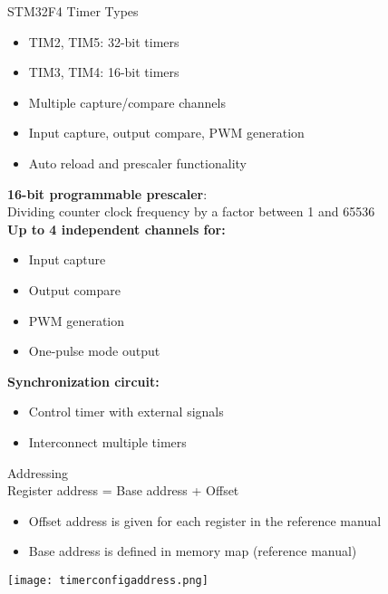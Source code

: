 \begin{concept}{STM32F4 Timer Types}
    \begin{itemize}
        \item TIM2, TIM5: 32-bit timers
        \item TIM3, TIM4: 16-bit timers
        \item Multiple capture/compare channels
        \item Input capture, output compare, PWM generation
        \item Auto reload and prescaler functionality
    \end{itemize}
\textbf{16-bit programmable prescaler}: \\
Dividing counter clock frequency by a factor between 1 and 65536\\
\textbf{Up to 4 independent channels for:}

\begin{minipage}{0.45\linewidth}
\begin{itemize}
    \item Input capture
    \item Output compare
\end{itemize}
\end{minipage}
\begin{minipage}{0.5\linewidth}
\begin{itemize}
    \item PWM generation
    \item One-pulse mode output
\end{itemize}
\end{minipage}

\textbf{Synchronization circuit:}
\begin{itemize}
    \item Control timer with external signals
    \item Interconnect multiple timers
\end{itemize}
\end{concept}

\begin{theorem}{Addressing} \\
    Register address = Base address + Offset
    \begin{itemize}
        \item Offset address is given for each register in the reference manual
        \item Base address is defined in memory map (reference manual)
    \end{itemize}
    \texttt{[image: timerconfigaddress.png]}
\end{theorem}

